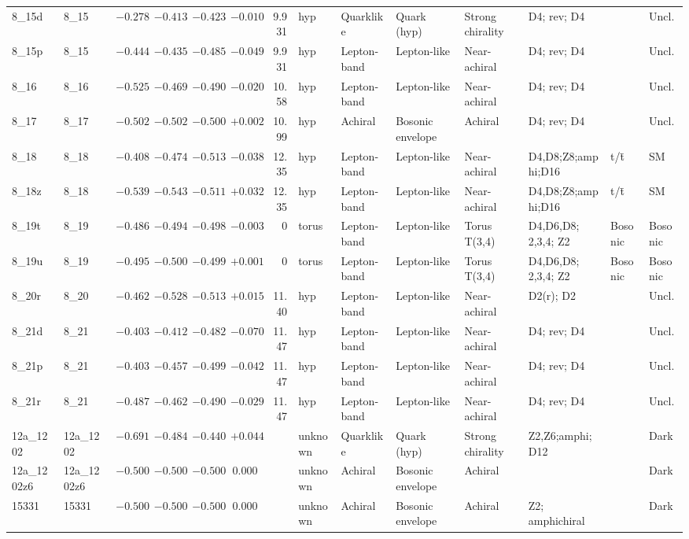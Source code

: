 \begin{landscape}
\begin{longtable}{@{}llrrrrrllp{3.2cm}lp{2.8cm}@{}}
8\_15d & 8\_15 & $-0.278$ & $-0.413$ & $-0.423$ & $-0.010$ & 9.931 & hyp & Quarklike & Quark (hyp) & Strong chirality & D4; rev; D4 & & Uncl. \\
8\_15p & 8\_15 & $-0.444$ & $-0.435$ & $-0.485$ & $-0.049$ & 9.931 & hyp & Lepton-band & Lepton-like & Near-achiral & D4; rev; D4 & & Uncl. \\
8\_16 & 8\_16 & $-0.525$ & $-0.469$ & $-0.490$ & $-0.020$ & 10.58 & hyp & Lepton-band & Lepton-like & Near-achiral & D4; rev; D4 & & Uncl. \\
8\_17 & 8\_17 & $-0.502$ & $-0.502$ & $-0.500$ & $+0.002$ & 10.99 & hyp & Achiral & Bosonic envelope & Achiral & D4; rev; D4 & & Uncl. \\
8\_18 & 8\_18 & $-0.408$ & $-0.474$ & $-0.513$ & $-0.038$ & 12.35 & hyp & Lepton-band & Lepton-like & Near-achiral & D4,D8;Z8;amphi;D16 & t/t̄ & SM \\
8\_18z & 8\_18 & $-0.539$ & $-0.543$ & $-0.511$ & $+0.032$ & 12.35 & hyp & Lepton-band & Lepton-like & Near-achiral & D4,D8;Z8;amphi;D16 & t/t̄ & SM \\
8\_19t & 8\_19 & $-0.486$ & $-0.494$ & $-0.498$ & $-0.003$ & 0 & torus & Lepton-band & Lepton-like & Torus T(3,4) & D4,D6,D8; 2,3,4; Z2 & Bosonic & Bosonic \\
8\_19u & 8\_19 & $-0.495$ & $-0.500$ & $-0.499$ & $+0.001$ & 0 & torus & Lepton-band & Lepton-like & Torus T(3,4) & D4,D6,D8; 2,3,4; Z2 & Bosonic & Bosonic \\
8\_20r & 8\_20 & $-0.462$ & $-0.528$ & $-0.513$ & $+0.015$ & 11.40 & hyp & Lepton-band & Lepton-like & Near-achiral & D2(r); D2 & & Uncl. \\
8\_21d & 8\_21 & $-0.403$ & $-0.412$ & $-0.482$ & $-0.070$ & 11.47 & hyp & Lepton-band & Lepton-like & Near-achiral & D4; rev; D4 & & Uncl. \\
8\_21p & 8\_21 & $-0.403$ & $-0.457$ & $-0.499$ & $-0.042$ & 11.47 & hyp & Lepton-band & Lepton-like & Near-achiral & D4; rev; D4 & & Uncl. \\
8\_21r & 8\_21 & $-0.487$ & $-0.462$ & $-0.490$ & $-0.029$ & 11.47 & hyp & Lepton-band & Lepton-like & Near-achiral & D4; rev; D4 & & Uncl. \\
12a\_1202 & 12a\_1202 & $-0.691$ & $-0.484$ & $-0.440$ & $+0.044$ & & unknown & Quarklike & Quark (hyp) & Strong chirality & Z2,Z6;amphi;D12 & & Dark \\
12a\_1202z6 & 12a\_1202z6 & $-0.500$ & $-0.500$ & $-0.500$ & 0.000 & & unknown & Achiral & Bosonic envelope & Achiral & & & Dark \\
15331 & 15331 & $-0.500$ & $-0.500$ & $-0.500$ & 0.000 & & unknown & Achiral & Bosonic envelope & Achiral & Z2; amphichiral & & Dark \\
\end{longtable}


\end{landscape}
